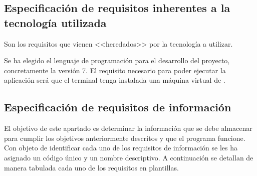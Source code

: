 \subsection{Especificación de requisitos inherentes a la tecnología utilizada}
Son los requisitos que vienen <<heredados>> por la tecnología a utilizar.

Se ha elegido el lenguaje de programación \java{} para el desarrollo del proyecto, concretamente la versión 7. El requisito necesario para poder ejecutar la aplicación será que el terminal tenga instalada una máquina virtual de \java{}.


\subsection{Especificación de requisitos de información}
El objetivo de este apartado es determinar la información que se debe almacenar para cumplir los objetivos anteriormente descritos y que el programa funcione.
Con objeto de identificar cada uno de los requisitos de información se les ha asignado un código único y un nombre descriptivo. A continuación  se detallan de manera tabulada cada uno de los requisitos en plantillas.

